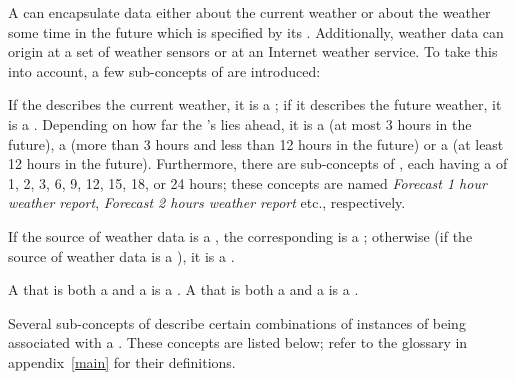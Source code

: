A  can encapsulate data either about the current weather or about the weather some time in the future which is specified by its . Additionally, weather data can origin at a set of weather sensors or at an Internet weather service. To take this into account, a few sub-concepts of  are introduced:

If the  describes the current weather, it is a ; if it describes the future weather, it is a . Depending on how far the 's  lies ahead, it is a  (at most 3 hours in the future), a  (more than 3 hours and less than 12 hours in the future) or a  (at least 12 hours in the future). Furthermore, there are sub-concepts of , each having a  of 1, 2, 3, 6, 9, 12, 15, 18, or 24 hours; these concepts are named \emph{Forecast 1 hour weather report}, \emph{Forecast 2 hours weather report} etc., respectively.

If the source of weather data is a , the corresponding  is a ; otherwise (if the source of weather data is a ), it is a .

A  that is both a  and a  is a . A  that is both a  and a  is a .

Several sub-concepts of  describe certain combinations of instances of  being associated with a . These concepts are listed below; refer to the glossary in appendix~\ref{main} for their definitions.

